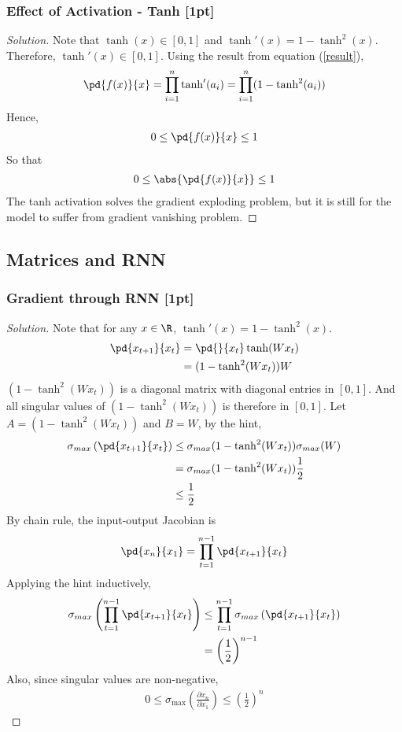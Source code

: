 \documentclass{article}
\begin{document}
	\subsubsection{Effect of Activation - Tanh [1pt]}
	\begin{proof}[Solution]
		Note that $\tanh(x) \in [0, 1]$ and $\tanh'(x) = 1 - \tanh^2(x)$. Therefore, $\tanh'(x) \in [0, 1]$. Using the result from equation (\ref{result}),
		\begin{align}
			\pd{f(x)}{x} = \prod_{i=1}^n \tanh'(a_i) = \prod_{i=1}^n (1 - \tanh^2(a_i))
		\end{align}
		Hence,
		\begin{align}
			0 \leq \pd{f(x)}{x} \leq 1
		\end{align}
		So that
		\begin{align}
			0 \leq \abs{\pd{f(x)}{x}} \leq 1
		\end{align}
		The tanh activation solves the gradient exploding problem, but it is still for the model to suffer from gradient vanishing problem.
	\end{proof}

	\subsection{Matrices and RNN}
	\subsubsection{Gradient through RNN [1pt]}
	\begin{proof}[Solution]
		Note that for any $x \in \R$, $\tanh'(x) = 1 - \tanh^2(x)$.
		\begin{align}
			\pd{x_{t+1}}{x_t} &= \pd{}{x_t} \tanh(W x_t) \\
			&= (1 - \tanh^2(W x_t)) W
		\end{align}
		$(1 - \tanh^2(W x_t))$ is a diagonal matrix with diagonal entries in $[0, 1]$. And all singular values of $(1 - \tanh^2(W x_t))$ is therefore in $[0, 1]$. Let $A = (1 - \tanh^2(W x_t))$ and $B = W$, by the hint,
		\begin{align}
			\sigma_{max}\left(\pd{x_{t+1}}{x_t} \right)
			&\leq \sigma_{max}(1 - \tanh^2(W x_t)) \sigma_{max}(W) \\
			&=\sigma_{max}(1 - \tanh^2(W x_t)) \frac{1}{2} \\
			&\leq \frac{1}{2}
		\end{align}
		By chain rule, the input-output Jacobian is
		\begin{align}
			\pd{x_n}{x_1} = \prod_{t=1}^{n-1} \pd{x_{t+1}}{x_t}
		\end{align}
		Applying the hint inductively,
		\begin{align}
			\sigma_{max} \left(\prod_{t=1}^{n-1} \pd{x_{t+1}}{x_t} \right)
			&\leq \prod_{t=1}^{n-1} \sigma_{max}\left(\pd{x_{t+1}}{x_t}\right) \\
			&=  \left(\frac{1}{2}\right)^{n-1}
		\end{align}
		Also, since singular values are non-negative,
		\begin{align}
			0 \leq \sigma_{\max }\left(\frac{\partial x_{n}}{\partial x_{1}}\right) \leq\left(\frac{1}{2}\right)^{n}
		\end{align}
	\end{proof}
\end{document}
